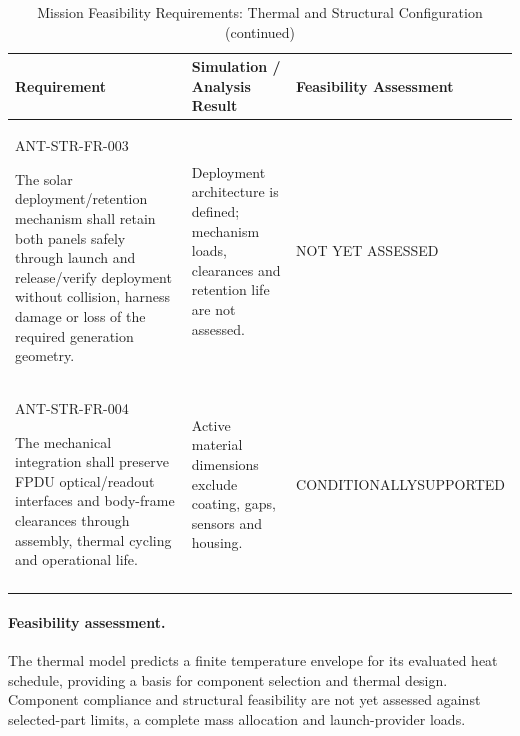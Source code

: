 \begin{table}[H]\centering\small\setlength{\tabcolsep}{3pt}
\ContinuedFloat\captionsetup{list=no}
\caption{Mission Feasibility Requirements: Thermal and Structural Configuration (continued)}
\begin{tabular}{@{}
>{\RaggedRight\arraybackslash}p{}
>{\RaggedRight\arraybackslash}p{}
>{\RaggedRight\arraybackslash}p{}
@{}}
\toprule Requirement & Simulation / Analysis Result & Feasibility Assessment\\\midrule
{}\label{req:ANT-STR-FR-003}\mbox{ANT-STR-}\newline\mbox{FR-003}\par The solar deployment/retention mechanism shall retain both panels safely through launch and release/verify deployment without collision, harness damage or loss of the required generation geometry. & Deployment architecture is defined; mechanism loads, clearances and retention life are not assessed. & NOT YET ASSESSED\\
\addlinespace[3pt]
\label{req:ANT-STR-FR-004}\mbox{ANT-STR-}\newline\mbox{FR-004}\par The mechanical integration shall preserve FPDU optical/readout interfaces and body-frame clearances through assembly, thermal cycling and operational life. & Active material dimensions exclude coating, gaps, sensors and housing. & CONDITIONALLY\newline SUPPORTED\\
\addlinespace[3pt]
\bottomrule
\end{tabular}
\end{table}
\paragraph{Feasibility assessment.} The thermal model predicts a finite temperature envelope for its evaluated heat schedule, providing a basis for component selection and thermal design. Component compliance and structural feasibility are not yet assessed against selected-part limits, a complete mass allocation and launch-provider loads.
